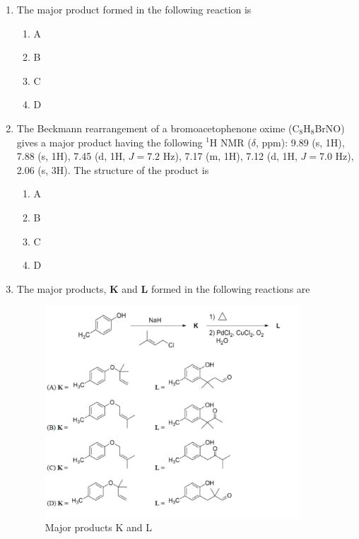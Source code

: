 \documentclass[journal,12pt,onecolumn]{exam}
\theoremstyle{remark}
\newcommand{\correct}{\textcolor{correctgreen}{\checkmark}}
\newcommand{\wrong}{\textcolor{wrongred}{\ding{55}}} %
\begin{document}
\begin{enumerate}
\item
The major product formed in the following reaction is


\begin{multicols}{2}
\begin{enumerate}[leftmargin=*, align=left]
\item \wrong A
\item \correct B
\item \wrong C
\item \wrong D
\end{enumerate}
\end{multicols}






\item
The Beckmann rearrangement of a bromoacetophenone oxime (C$_8$H$_8$BrNO) gives a major product having the following $^1$H NMR ($\delta$, ppm): 9.89 (s, 1H), 7.88 (s, 1H), 7.45 (d, 1H, $J = 7.2$ Hz), 7.17 (m, 1H), 7.12 (d, 1H, $J = 7.0$ Hz), 2.06 (s, 3H). The structure of the product is


\begin{multicols}{2}
\begin{enumerate}[leftmargin=*, align=left]
\item \correct A
\item \wrong B
\item \wrong C
\item \wrong D
\end{enumerate}
\end{multicols}





\item
The major products, \textbf{K} and \textbf{L} formed in the following reactions are
\begin{figure}[H]
\centering
\includegraphics[width=0.9\textwidth]{figs/image8.jpg}
\caption{Major products K and L}
\label{fig:q65}
\end{figure}


\end{enumerate}
\end{document}
